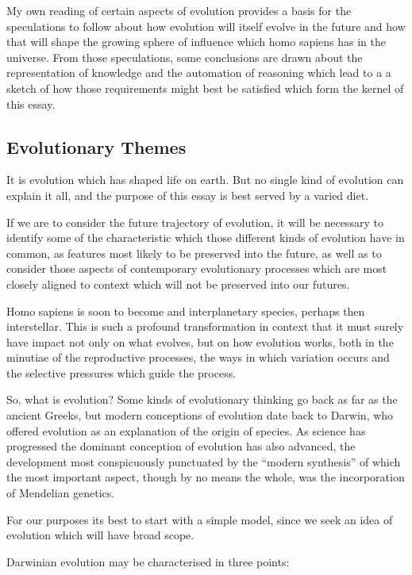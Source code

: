 \documentclass[10pt,titlepage]{book}
\begin{document}
My own reading of certain aspects of evolution provides a basis for the speculations to follow about how evolution will itself evolve in the future and how that will shape the growing sphere of influence which homo sapiens has in the universe.
From those speculations, some conclusions are drawn about the representation of knowledge and the automation of reasoning which lead to a a sketch of how those requirements might best be satisfied which form the kernel of this essay.

\subsection{Evolutionary Themes}

It is evolution which has shaped life on earth.
But no single kind of evolution can explain it all, and the purpose of this essay is best served by a varied diet.

If we are to consider the future trajectory of evolution, it will be necessary to identify some of the characteristic which those different kinds of evolution have in common, as features most likely to be preserved into the future, as well as to consider those aspects of contemporary evolutionary processes which are most closely aligned to context which will not be preserved into our futures.

Homo sapiens is soon to become and interplanetary species, perhaps then interstellar.
This is such a profound transformation in context that it must surely have impact not only on what evolves, but on how evolution works, both in the minutiae of the reproductive processes, the ways in which variation occurs and the selective pressures which guide the process.

So, what is evolution?
Some kinds of evolutionary thinking go back as far as the ancient Greeks, but modern conceptions of evolution date back to Darwin, who offered evolution as an explanation of the origin of species.
As science has progressed the dominant conception of evolution has also advanced, the development most conspicuously punctuated by the ``modern synthesis'' of which the most important aspect, though by no means the whole, was the incorporation of Mendelian genetics.

For our purposes its best to start with a simple model, since we seek an idea of evolution which will have broad scope.

Darwinian evolution may be characterised in three points:
\end{document}
